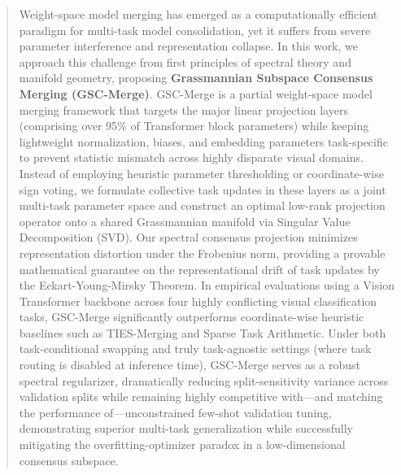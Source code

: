 \begin{abstract}
Weight-space model merging has emerged as a computationally efficient paradigm for multi-task model consolidation, yet it suffers from severe parameter interference and representation collapse.
In this work, we approach this challenge from first principles of spectral theory and manifold geometry, proposing \textbf{Grassmannian Subspace Consensus Merging (GSC-Merge)}.
GSC-Merge is a partial weight-space model merging framework that targets the major linear projection layers (comprising over 95\% of Transformer block parameters) while keeping lightweight normalization, biases, and embedding parameters task-specific to prevent statistic mismatch across highly disparate visual domains.
Instead of employing heuristic parameter thresholding or coordinate-wise sign voting, we formulate collective task updates in these layers as a joint multi-task parameter space and construct an optimal low-rank projection operator onto a shared Grassmannian manifold via Singular Value Decomposition (SVD).
Our spectral consensus projection minimizes representation distortion under the Frobenius norm, providing a provable mathematical guarantee on the representational drift of task updates by the Eckart-Young-Mirsky Theorem.
In empirical evaluations using a Vision Transformer backbone across four highly conflicting visual classification tasks, GSC-Merge significantly outperforms coordinate-wise heuristic baselines such as TIES-Merging and Sparse Task Arithmetic. Under both task-conditional swapping and truly task-agnostic settings (where task routing is disabled at inference time), GSC-Merge serves as a robust spectral regularizer, dramatically reducing split-sensitivity variance across validation splits while remaining highly competitive with---and matching the performance of---unconstrained few-shot validation tuning, demonstrating superior multi-task generalization while successfully mitigating the overfitting-optimizer paradox in a low-dimensional consensus subspace.
\end{abstract}
